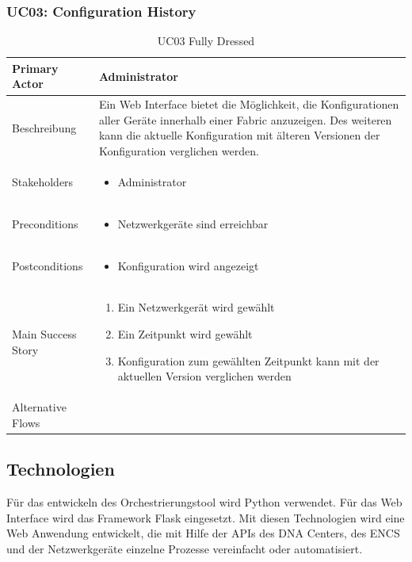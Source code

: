 \subsubsection{UC03: Configuration History}
\begin{table}[H]
	\centering
	\begin{tabularx}{\textwidth}{l | X}
		Primary Actor      & Administrator        \\
		\hline
		Beschreibung       & Ein Web Interface bietet die Möglichkeit, die Konfigurationen aller Geräte innerhalb einer Fabric anzuzeigen. Des weiteren kann die aktuelle Konfiguration mit älteren Versionen der Konfiguration verglichen werden. \\ 
		\hline
		Stakeholders       &  
		\begin{itemize}	
			\item Administrator
		\end{itemize}              \\
		\hline
		Preconditions      & 
		\begin{itemize}	
			\item Netzwerkgeräte sind erreichbar
		\end{itemize}  \\
		\hline
		Postconditions     & 
		\begin{itemize}	
			\item Konfiguration wird angezeigt
		\end{itemize}  \\
		\hline
		Main Success Story & 
		\begin{enumerate}
			\item Ein Netzwerkgerät wird gewählt
			\item Ein Zeitpunkt wird gewählt
			\item Konfiguration zum gewählten Zeitpunkt kann mit der aktuellen Version verglichen werden
		\end{enumerate}
		\\
		\hline
		Alternative Flows  & 
	\end{tabularx}
	\caption{UC03 Fully Dressed}
	\label{tab:UC03}
\end{table}

\subsection{Technologien}
Für das entwickeln des Orchestrierungstool wird Python verwendet. Für das Web Interface wird das Framework Flask eingesetzt. Mit diesen Technologien wird eine Web Anwendung entwickelt, die mit Hilfe der APIs des DNA Centers, des ENCS und der Netzwerkgeräte einzelne Prozesse vereinfacht oder automatisiert.

